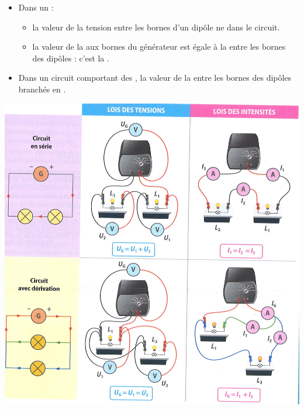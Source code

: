 \documentclass[xcolor={dvipsnames}]{beamer}
\begin{document}
\begin{frame}


\begin{mybilan}
	\begin{itemize}
		\item Dans un  :\pause
		\begin{itemize}
			\item la valeur de la tension entre les bornes d'un dipôle ne  dans le circuit.\pause
			\item la valeur de la  aux bornes du générateur est égale à la  entre les bornes des dipôles : c'est la .\pause
		\end{itemize}
		
		
		\item Dans un circuit comportant des , la valeur de la  entre les bornes des dipôles branchés en .
		
		
	\end{itemize}
\end{mybilan}
\end{frame}


\begin{frame}
	\begin{center}
		\includegraphics[scale=0.5]{lois_elec}
	\end{center}
\end{frame}
\end{document}
